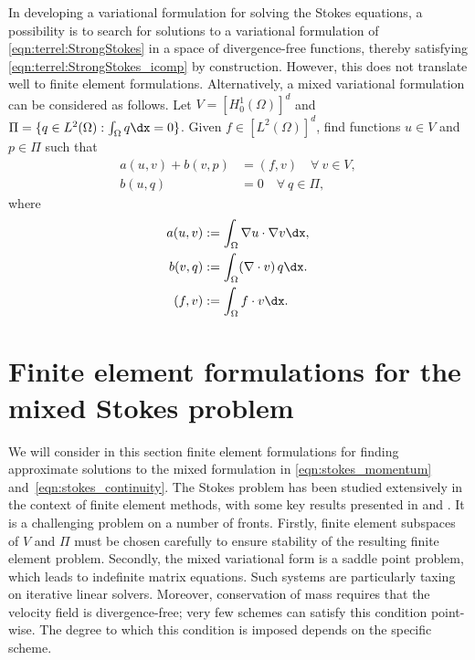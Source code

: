 In developing a variational formulation for solving the Stokes equations,
a possibility is to search for solutions to a variational formulation of
\eqref{eqn:terrel:StrongStokes} in a space of divergence-free functions,
thereby satisfying \eqref{eqn:terrel:StrongStokes_icomp} by construction.
However, this does not translate well to finite element
formulations. Alternatively, a mixed variational formulation can be
considered as follows. Let $V = [H^{1}_{0}(\Omega)]^d$ and $\Pi = \{q \in
L^2(\Omega) : \int_\Omega q \dx = 0\}$.  Given $f \in [L^{2}(\Omega)]^d$,
find functions $u \in V$ and $p \in \Pi$ such that
%
\begin{align}
    a(u, v) + b(v, p)  &=  (f, v) \quad \forall \ v \in V,
\label{eqn:stokes_momentum}
\\
    b(u, q) &= 0 \quad \forall \ q \in \Pi,
\label{eqn:stokes_continuity}
\end{align}
%
where
%
\begin{align}
  a(u, v) &:= \int_\Omega \nabla{u} \cdot \nabla v \dx,
\\
  b(v, q) &:= \int_\Omega (\nabla\cdot v) \, q \dx.
\\
  (f, v) &:= \int_\Omega f \cdot v \dx.
\end{align}
\section{Finite element formulations for the mixed Stokes problem}

We will consider in this section finite element formulations
for finding approximate solutions to the mixed formulation in
\eqref{eqn:stokes_momentum} and~\eqref{eqn:stokes_continuity}.  The Stokes
problem has been studied extensively in the context of finite element
methods, with some key results presented in \citet{BrezziFortin1991}
and \citet{BrennerScott2008}.  It is a challenging problem on a number
of fronts.  Firstly, finite element subspaces of $V$ and $\Pi$ must be
chosen carefully to ensure stability of the resulting finite element
problem. Secondly, the mixed variational form is a saddle point problem,
which leads to indefinite matrix equations. Such systems are particularly
taxing on iterative linear solvers.  Moreover, conservation of mass requires
that the velocity field is divergence-free; very few schemes can satisfy
this condition point-wise.  The degree to which this condition is imposed
depends on the specific scheme.


